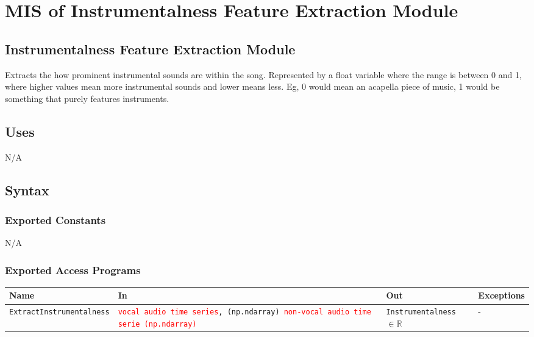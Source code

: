 \documentclass[12pt, titlepage]{article}
\begin{document}
\section{MIS of Instrumentalness Feature Extraction Module} 

\subsection{Instrumentalness Feature Extraction Module}
Extracts the how prominent instrumental sounds are within the song. Represented by a float
variable where the range is between 0 and 1, where higher values mean more instrumental sounds
and lower means less. Eg, 0 would mean an acapella piece of music, 1 would be something that purely
features instruments.  

\subsection{Uses}
N/A

\subsection{Syntax}

\subsubsection{Exported Constants}
N/A

\subsubsection{Exported Access Programs}

\begin{center}
\begin{tabular}{p{4cm} p{4cm} p{4cm} p{2cm}}
\hline
\textbf{Name} & \textbf{In} & \textbf{Out} & \textbf{Exceptions}\\
\hline%
\texttt{Extract\linebreak Instrumentalness} &\texttt{\textcolor{red}{vocal audio time series}, \linebreak (np.ndarray) \linebreak \textcolor{red}{non-vocal audio time serie \linebreak (np.ndarray)}} &\texttt{Instrumentalness} $\in \mathbb{R}$ &-\\
\hline
\end{tabular}
\end{center}
\end{document}
